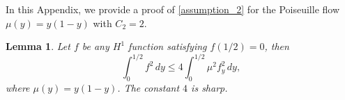 \documentclass[reqno, 11pt]{amsart}
\theoremstyle{plain}
\newtheorem{lemma}[theorem]{Lemma}
\theoremstyle{definition}
\theoremstyle{remark}
\numberwithin{equation}{section}
\begin{document}

\appendix
\section{}\label{Sec:appendix}


In this Appendix, we provide a proof of \eqref{assumption_2} for the Poiseuille flow $\mu(y) = y(1-y)$ with $C_2 = 2$.

\begin{lemma}
Let $f$ be any $H^1$ function satisfying $f(1/2) = 0$, then
\begin{equation}\label{Hardy_goal}
\int_0^{1/2} f^2 \, dy \le 4 \int_0^{1/2} \mu^2 f_y^2 \, dy,
\end{equation}
where $\mu (y) = y(1-y)$. The constant $4$ is sharp.
\end{lemma}
\end{document}
